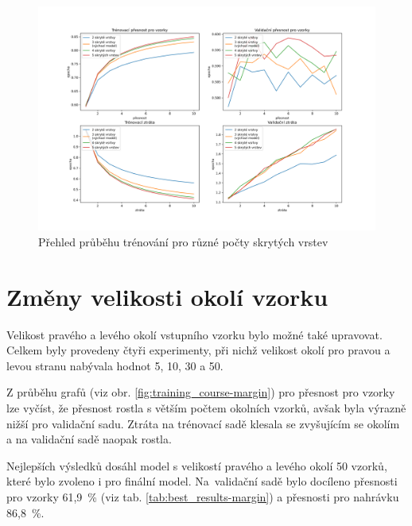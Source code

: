 \documentclass[FM,BP]{tulthesis}
\begin{document}
\begin{figure}[!htbp]
\centerline{\includegraphics[scale=.5]{training_course-layers.png}}
\caption{Přehled průběhu trénování pro různé počty skrytých vrstev}
\label{fig:training_course-layers}
\end{figure}
\FloatBarrier

\section{Změny velikosti okolí vzorku} %
Velikost pravého a levého okolí vstupního vzorku bylo možné také upravovat. Celkem byly provedeny čtyři experimenty, při nichž velikost okolí pro pravou a levou stranu nabývala hodnot 5, 10, 30 a 50.

Z průběhu grafů (viz obr. \mbox{\ref{fig:training_course-margin}}) pro přesnost pro vzorky lze vyčíst, že přesnost rostla s větším počtem okolních vzorků, avšak byla výrazně nižší pro validační sadu. Ztráta na trénovací sadě klesala se zvyšujícím se okolím a na validační sadě naopak rostla.

Nejlepších výsledků dosáhl model s velikostí pravého a levého okolí 50 vzorků, které bylo zvoleno i pro finální model. Na~validační sadě bylo docíleno přesnosti pro vzorky \mbox{61,9 \%} (viz tab. \mbox{\ref{tab:best_results-margin}}) a přesnosti pro nahrávku \mbox{86,8 \%}. 
\end{document}
